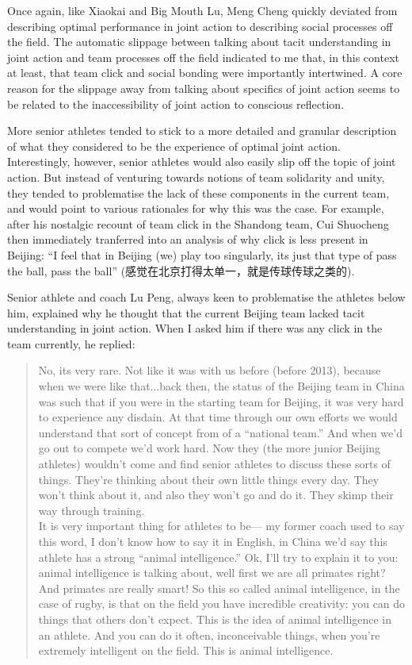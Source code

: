 \begin{CJK}{UTF8}{gbsn}
Once again, like Xiaokai and Big Mouth Lu, Meng Cheng quickly deviated from describing optimal performance in joint action to describing social processes off the field.  The automatic slippage between talking about tacit understanding in joint action and team processes off the field indicated to me that, in this context at least, that team click and social bonding were importantly intertwined.  A core reason for the slippage away from talking about specifics of joint action seems to be related to the inaccessibility of joint action to conscious reflection.

More senior athletes tended to stick to a more detailed and granular description of what they considered to be the experience of optimal joint action. Interestingly, however, senior athletes would also easily slip off the topic of joint action.  But instead of venturing towards notions of team solidarity and unity, they tended to problematise the lack of these components in the current team, and would point to various rationales for why this was the case.  For example, after his nostalgic recount of team click in the Shandong team, Cui Shuocheng then immediately tranferred into an analysis of why click is less present in Beijing: ``I feel that in Beijing (we) play too singularly, its just that type of pass the ball, pass the ball''  (感觉在北京打得太单一，就是传球传球之类的).

Senior athlete and coach Lu Peng, always keen to problematise the athletes below him, explained why he thought that the current Beijing team lacked tacit understanding in joint action.  When I asked him if there was any click in the team currently, he replied:

      \begin{quote}
        No, its very rare.  Not like it was with us before (before 2013), because when we were like that...back then, the status of the Beijing team in China was such that if you were in the starting team for Beijing, it was very hard to experience any disdain.  At that time through our own efforts we would understand that sort of concept from of a ``national team.'' And when we'd go out to compete we'd work hard.  Now they (the more junior Beijing athletes) wouldn't come and find senior athletes to discuss these sorts of things.  They're thinking about their own little things every day.  They won't think about it, and also they won't go and do it.  They skimp their way through training.  \\

        It is very important thing for athletes to be--- my former coach used to say this word, I don't know how to say it in English, in China we'd say this athlete has a strong ``animal intelligence.'' Ok, I'll try to explain it to you: animal intelligence is talking about, well first we are all primates right?  And primates are really smart!  So this so called animal intelligence, in the case of rugby, is that on the field you have incredible creativity: you can do things that others don't expect.  This is the idea of animal intelligence in an athlete.  And you can do it often, inconceivable things, when you're extremely intelligent on the field. This is animal intelligence.
      \end{quote}


\end{CJK}
